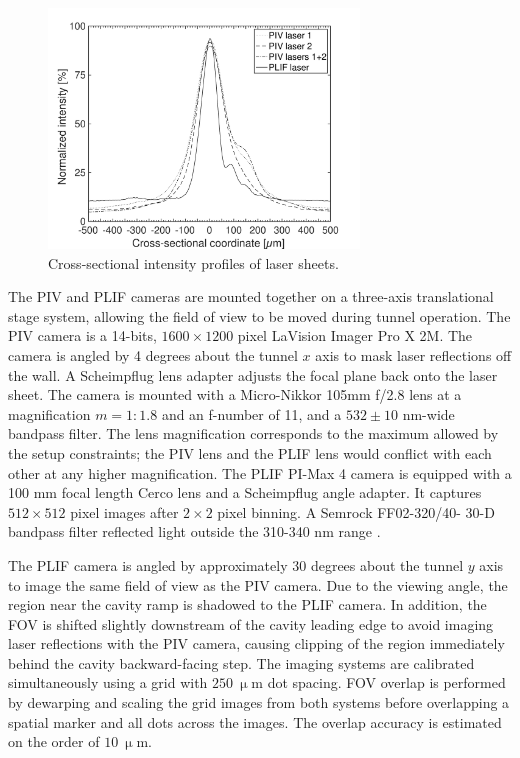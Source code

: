 \begin{figure}
\centering
\includegraphics[width=3.25in, trim=0.35in 0in 0.75in 0in, clip]{figures/B_f_overlap_all} %
\caption{Cross-sectional intensity profiles of laser sheets.}\label{fig:ch3_meas_LS_thick}
\end{figure}

The PIV and PLIF cameras are mounted together on a three-axis translational stage system, allowing the field of view to be moved during tunnel operation.
The PIV camera is a 14-bits, $1600\times 1200$ pixel LaVision Imager Pro X 2M. The camera is angled by 4 degrees about the tunnel $x$ axis to mask laser reflections off the wall. A Scheimpflug lens adapter adjusts the focal plane back onto the laser sheet. The camera is mounted with a Micro-Nikkor 105mm f/2.8 lens at a magnification $m=1:1.8$ and an f-number of 11, and a $532 \pm 10$ nm-wide bandpass filter. The lens magnification corresponds to the maximum allowed by the setup constraints; the PIV lens and the PLIF lens would conflict with each other at any higher magnification. The PLIF PI-Max 4 camera is equipped with a 100 mm focal length Cerco lens and a Scheimpflug angle adapter. It captures $512\times 512$ pixel images after $2\times2$ pixel binning. A Semrock FF02-320/40- 30-D bandpass filter reflected light outside the 310-340 nm range \citep{GeipelRockwellChelliahEtAl2017}. 

The PLIF camera is angled by approximately 30 degrees about the tunnel $y$ axis to image the same field of view as the PIV camera. Due to the viewing angle, the region near the cavity ramp is shadowed to the PLIF camera. In addition, the FOV is shifted slightly downstream of the cavity leading edge to avoid imaging laser reflections with the PIV camera, causing clipping of the region immediately behind the cavity backward-facing step. The imaging systems are calibrated simultaneously using a grid with $250~ \mathrm{\upmu m}$ dot spacing. FOV overlap is performed by dewarping and scaling the grid images from both systems before overlapping a spatial marker and all dots across the images. The overlap accuracy is estimated on the order of $10~ \mathrm{\upmu m}$. 

